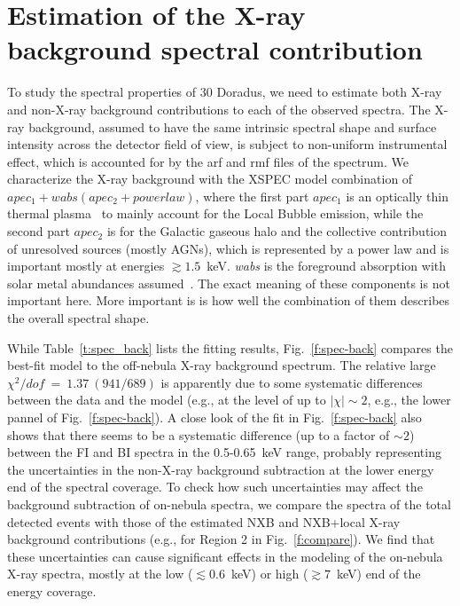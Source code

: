 \documentclass[usenatbib]{mnras}
\def\xs{30 Doradus}
\begin{document}
\appendix
\section{Estimation of the X-ray background spectral contribution}
\label{a:spec_back}
To study the spectral properties of \xs, we need to estimate both X-ray and non-X-ray background contributions to each of the observed spectra. The X-ray background, assumed to have the same intrinsic spectral shape and surface intensity across the detector field of view, is subject to non-uniform instrumental effect, which is accounted for by the arf and rmf files of the spectrum. We characterize the X-ray background with the XSPEC model combination of 
$apec_1 + wabs(apec_2+powerlaw)$, where the first part \textit{$apec_1$} is an optically thin thermal plasma~\citep{Smith} to mainly account for the Local Bubble emission, while the second part \textit{$apec_2$}  is for the Galactic gaseous halo  and the collective contribution of unresolved sources (mostly AGNs), which is represented by a power law and is important mostly at energies $\gtrsim 1.5$~keV. \textit{wabs} is the foreground absorption with solar metal abundances assumed~\citep{Morrison}. The exact meaning of these components is not important here. More important is is how well the combination of them describes the overall spectral shape. 

While Table~\ref{t:spec_back} lists the fitting results, Fig.~\ref{f:spec-back} compares the best-fit model to the off-nebula X-ray background spectrum. The relative large $\chi^2/dof\ =\ 1.37\ (941/689)$ is apparently due to some systematic differences between the data and the model (e.g., at the level of up to $|\chi| \sim 2$, e.g., the lower pannel of Fig.~\ref{f:spec-back}). A close look of the fit in Fig.~\ref{f:spec-back} also shows that there seems to be a systematic difference (up to a factor of $\sim 2$) between the FI and BI spectra in the 0.5-0.65~keV range, probably representing the uncertainties in the non-X-ray background subtraction at the lower energy end of the spectral coverage. To check how such uncertainties may affect  the background subtraction of on-nebula spectra, we compare the spectra of the total detected events with those of the estimated NXB and NXB+local X-ray background contributions (e.g., for Region 2 in Fig.~\ref{f:compare}). We find that these uncertainties can cause significant effects in the modeling of the on-nebula X-ray spectra, mostly at the low ($\lesssim 0.6$~keV) or  high ($\gtrsim 7$~keV) end of the energy coverage.
\end{document}
